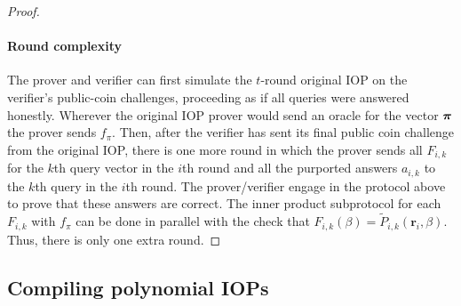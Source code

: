 \begin{proof}
\paragraph{Round complexity} The prover and verifier can first simulate the $t$-round original IOP  on the verifier's public-coin challenges, proceeding as if all queries were answered honestly. Wherever the original IOP prover would send an oracle for the vector $\boldsymbol{\pi}$ the prover sends $f_\pi$. Then, after the verifier has sent its final public coin challenge from the original IOP, there is one more round in which the prover sends all $F_{i, k}$ for the $k$th query vector in the $i$th round and all the purported answers $a_{i, k}$ to the $k$th query in the $i$th round. The prover/verifier engage in the protocol above to prove that these answers are correct. The inner product subprotocol for each $F_{i,k}$ with $f_\pi$ can be done in parallel with the check that $F_{i,k}(\beta) = \tilde{P}_{i,k}(\mathbf{r}_i, \beta)$. Thus, there is only one extra round.    
\end{proof}

\subsection{Compiling polynomial IOPs} 
\label{subsec:compiling}


